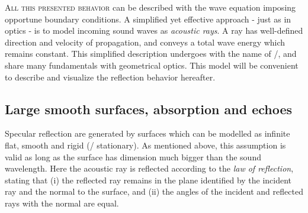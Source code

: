 \textsc{All this presented behavior} can be described with the wave equation imposing opportune boundary conditions.
A simplified yet effective approach - just as in optics - is to model incoming sound waves as \textit{acoustic rays}.
A ray has well-defined direction and velocity of propagation, and conveys a total wave energy which remains constant.
This simplified description undergoes with the name of \GAdef/\cite{savioja2015overview}, and share many fundamentals with geometrical optics.
This model will be convenient to describe and visualize the reflection behavior hereafter.

\subsection{Large smooth surfaces, absorption and echoes}
Specular reflection are generated by surfaces which can be modelled as infinite flat, smooth and rigid (\ie/ stationary).
As mentioned above, this assumption is valid as long as the surface has dimension much bigger than the sound wavelength.
Here the acoustic ray is reflected according to the \textit{law of reflection}, stating that
(i) the reflected ray remains in the plane identified by the incident ray and the normal to the surface,
and (ii) the angles of the incident and reflected rays with the normal are equal.

